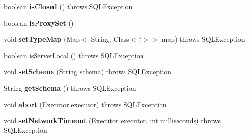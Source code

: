 \begin{DoxyCompactItemize}
boolean {\bfseries is\+Closed} ()  throws S\+Q\+L\+Exception 
\item 
\mbox{\label{classcom_1_1mysql_1_1cj_1_1jdbc_1_1ha_1_1_multi_host_my_s_q_l_connection_a1fc6293e6251ae130d1444c288a60031}} 
boolean {\bfseries is\+Proxy\+Set} ()
\item 
\mbox{\label{classcom_1_1mysql_1_1cj_1_1jdbc_1_1ha_1_1_multi_host_my_s_q_l_connection_a98ac07aa58b7cd26cae37b2d4c5f0893}} 
void {\bfseries set\+Type\+Map} (Map$<$ String, Class$<$?$>$$>$ map)  throws S\+Q\+L\+Exception 
\item 
boolean \mbox{\hyperlink{classcom_1_1mysql_1_1cj_1_1jdbc_1_1ha_1_1_multi_host_my_s_q_l_connection_ae6f52873381a19395473dd957c756ee7}{is\+Server\+Local}} ()  throws S\+Q\+L\+Exception 
\item 
\mbox{\label{classcom_1_1mysql_1_1cj_1_1jdbc_1_1ha_1_1_multi_host_my_s_q_l_connection_a681cee77f07b3459af4f090b6f41df91}} 
void {\bfseries set\+Schema} (String schema)  throws S\+Q\+L\+Exception 
\item 
\mbox{\label{classcom_1_1mysql_1_1cj_1_1jdbc_1_1ha_1_1_multi_host_my_s_q_l_connection_a54860b3c4d5ff373b2be0becb5c0f1e5}} 
String {\bfseries get\+Schema} ()  throws S\+Q\+L\+Exception 
\item 
\mbox{\label{classcom_1_1mysql_1_1cj_1_1jdbc_1_1ha_1_1_multi_host_my_s_q_l_connection_a81b223cea2f0bcd0c7d94d1786063ea0}} 
void {\bfseries abort} (Executor executor)  throws S\+Q\+L\+Exception 
\item 
\mbox{\label{classcom_1_1mysql_1_1cj_1_1jdbc_1_1ha_1_1_multi_host_my_s_q_l_connection_a5c72ea3234c18e6febe82e294404452c}} 
void {\bfseries set\+Network\+Timeout} (Executor executor, int milliseconds)  throws S\+Q\+L\+Exception 
\item 
\mbox{\label{classcom_1_1mysql_1_1cj_1_1jdbc_1_1ha_1_1_multi_host_my_s_q_l_connection_a0a63a135ec987088c02f52e7c5a9535c}} 
$$
\end{DoxyCompactItemize}
